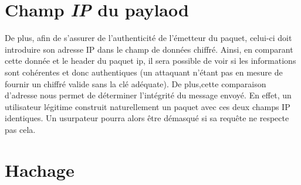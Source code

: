 \section{Champ \textbf{\emph{IP}} du paylaod}

De plus, afin de s'assurer de l'authenticité de l'émetteur du paquet, celui-ci doit introduire son adresse IP dans le champ de données chiffré. Ainsi, en comparant cette donnée et le header du paquet ip, il sera possible de voir si les informations sont cohérentes et donc authentiques (un attaquant n'étant pas en mesure de fournir un chiffré valide sans la clé adéquate). 
De plus,cette comparaison d'adresse nous permet de déterminer l'intégrité du message envoyé.
En effet, un utilisateur légitime construit naturellement un paquet avec ces deux champs IP identiques. Un usurpateur pourra alors être démasqué si sa requête ne respecte pas cela.

\section{Hachage}


